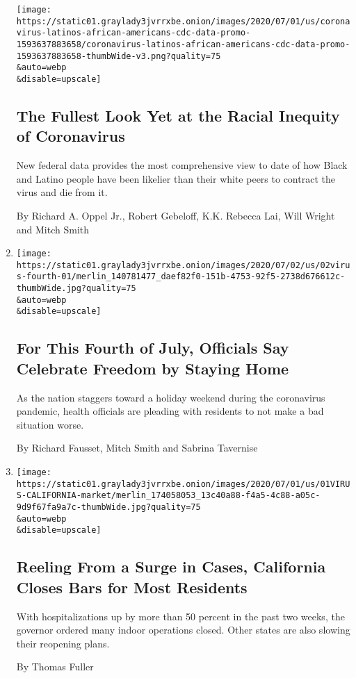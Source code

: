 \begin{enumerate}
  \texttt{[image: https://static01.graylady3jvrrxbe.onion/images/2020/07/01/us/coronavirus-latinos-african-americans-cdc-data-promo-1593637883658/coronavirus-latinos-african-americans-cdc-data-promo-1593637883658-thumbWide-v3.png?quality=75\\\&auto=webp\\\&disable=upscale]}

  \hypertarget{the-fullest-look-yet-at-the-racial-inequity-of-coronavirus}{%
  \subsection{The Fullest Look Yet at the Racial Inequity of
  Coronavirus}\label{the-fullest-look-yet-at-the-racial-inequity-of-coronavirus}}

  New federal data provides the most comprehensive view to date of how
  Black and Latino people have been likelier than their white peers to
  contract the virus and die from it.

  By Richard A. Oppel Jr., Robert Gebeloff, K.K. Rebecca Lai, Will
  Wright and Mitch Smith
\item
  \href{/2020/07/02/us/coronavirus-fourth-of-july.html}{}

  \texttt{[image: https://static01.graylady3jvrrxbe.onion/images/2020/07/02/us/02virus-fourth-01/merlin\_140781477\_daef82f0-151b-4753-92f5-2738d676612c-thumbWide.jpg?quality=75\\\&auto=webp\\\&disable=upscale]}

  \hypertarget{for-this-fourth-of-july-officials-say-celebrate-freedom-by-staying-home}{%
  \subsection{For This Fourth of July, Officials Say Celebrate Freedom
  by Staying
  Home}\label{for-this-fourth-of-july-officials-say-celebrate-freedom-by-staying-home}}

  As the nation staggers toward a holiday weekend during the coronavirus
  pandemic, health officials are pleading with residents to not make a
  bad situation worse.

  By Richard Fausset, Mitch Smith and Sabrina Tavernise
\item
  \href{/2020/07/01/us/california-coronavirus-reopening.html}{}

  \texttt{[image: https://static01.graylady3jvrrxbe.onion/images/2020/07/01/us/01VIRUS-CALIFORNIA-market/merlin\_174058053\_13c40a88-f4a5-4c88-a05c-9d9f67fa9a7c-thumbWide.jpg?quality=75\\\&auto=webp\\\&disable=upscale]}

  \hypertarget{reeling-from-a-surge-in-cases-california-closes-bars-for-most-residents}{%
  \subsection{Reeling From a Surge in Cases, California Closes Bars for
  Most
  Residents}\label{reeling-from-a-surge-in-cases-california-closes-bars-for-most-residents}}

  With hospitalizations up by more than 50 percent in the past two
  weeks, the governor ordered many indoor operations closed. Other
  states are also slowing their reopening plans.

  By Thomas Fuller
\end{enumerate}

